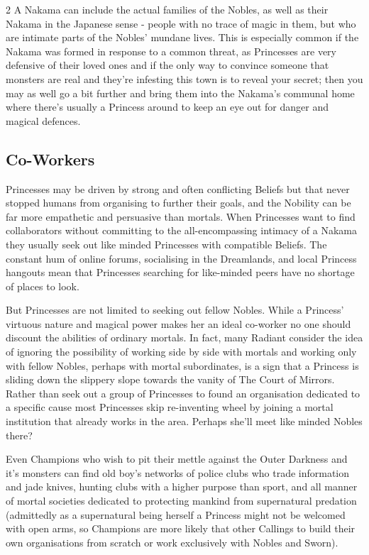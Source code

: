 \begin{multicols}{2}
A Nakama can include the actual families of the Nobles, as well as their Nakama in the Japanese sense - people with no trace of magic in them, but who are intimate parts of the Nobles' mundane lives. This is especially common if the Nakama was formed in response to a common threat, as Princesses are very defensive of their loved ones and if the only way to convince someone that monsters are real and they're infesting this town is to reveal your secret; then you may as well go a bit further and bring them into the Nakama's communal home where there's usually a Princess around to keep an eye out for danger and magical defences. 

\subsection*{Co-Workers}

Princesses may be driven by strong and often conflicting Beliefs but that never stopped humans from organising to further their goals, and the Nobility can be far more empathetic and persuasive than mortals. When Princesses want to find collaborators without committing to the all-encompassing intimacy of a Nakama they usually seek out like minded Princesses with compatible Beliefs. The constant hum of online forums, socialising in the Dreamlands, and local Princess hangouts mean that Princesses searching for like-minded peers have no shortage of places to look.

But Princesses are not limited to seeking out fellow Nobles. While a Princess' virtuous nature and magical power makes her an ideal co-worker no one should discount the abilities of ordinary mortals. In fact, many Radiant consider the idea of ignoring the possibility of working side by side with mortals and working only with fellow Nobles, perhaps with mortal subordinates, is a sign that a Princess is sliding down the slippery slope towards the vanity of The Court of Mirrors. Rather than seek out a group of Princesses to found an organisation dedicated to a specific cause most Princesses skip re-inventing wheel by joining a mortal institution that already works in the area. Perhaps she'll meet like minded Nobles there? 

Even Champions who wish to pit their mettle against the Outer Darkness and it's monsters can find old boy's networks of police clubs who trade information and jade knives, hunting clubs with a higher purpose than sport, and all manner of mortal societies dedicated to protecting mankind from supernatural predation (admittedly as a supernatural being herself a Princess might not be welcomed with open arms, so Champions are more likely that other Callings to build their own organisations from scratch or work exclusively with Nobles and Sworn). 


\end{multicols}
